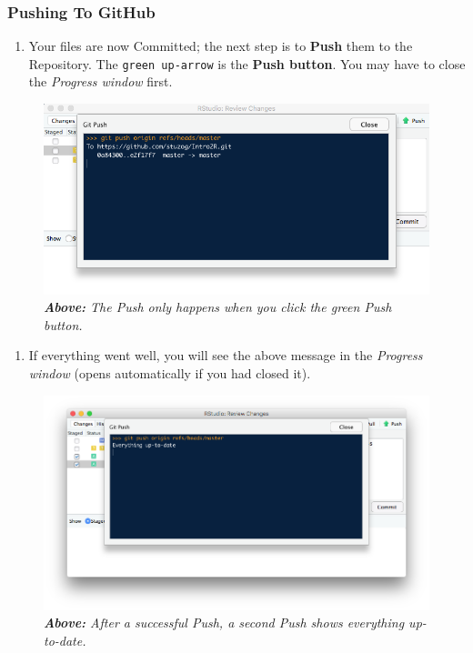 \documentclass[]{book}
\providecommand{\tightlist}{%
  \setlength{\itemsep}{0pt}\setlength{\parskip}{0pt}}
\theoremstyle{definition}
\theoremstyle{definition}
\theoremstyle{definition}
\theoremstyle{remark}
\begin{document}
\hypertarget{pushing-to-github}{%
\subsubsection{Pushing To GitHub}\label{pushing-to-github}}

\begin{enumerate}
\def\labelenumi{\arabic{enumi}.}
\setcounter{enumi}{4}
\tightlist
\item
  Your files are now Committed; the next step is to \textbf{Push} them
  to the Repository. The \texttt{green\ up-arrow} is the \textbf{Push
  button}. You may have to close the \emph{Progress window} first.
\end{enumerate}

\begin{figure}
\centering
\includegraphics{images/RStudio-push-progress.png}
\caption{\emph{\textbf{Above:} The Push only happens when you click the
green Push button.}}
\end{figure}

\begin{enumerate}
\def\labelenumi{\arabic{enumi}.}
\setcounter{enumi}{5}
\tightlist
\item
  If everything went well, you will see the above message in the
  \emph{Progress window} (opens automatically if you had closed it).
\end{enumerate}

\begin{figure}
\centering
\includegraphics{images/RStudio-push-changes.png}
\caption{\emph{\textbf{Above:} After a successful Push, a second Push
shows everything up-to-date.}}
\end{figure}
\end{document}

